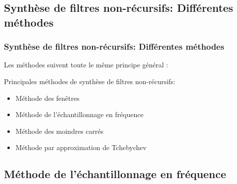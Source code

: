 \documentclass{beamer}
\begin{document}
\subsection{Synthèse de filtres non-récursifs: Différentes méthodes}
\begin{frame}
\frametitle{Synthèse de filtres non-récursifs: Différentes méthodes}
Les méthodes suivent toute le même principe général :

\begin{center}
\end{center}

Principales méthodes de synthèse de filtres non-récursifs:
\vspace{0.2cm}
\begin{itemize}
\item<2-> Méthode des fenêtres 
\item<3-> Méthode de l'échantillonnage en fréquence
\item<4-> Méthode des moindres carrés
\item<5-> Méthode par approximation de Tchebychev
\end{itemize}

\end{frame}

\subsection{Méthode de l'échantillonnage en fréquence}
\end{document}
